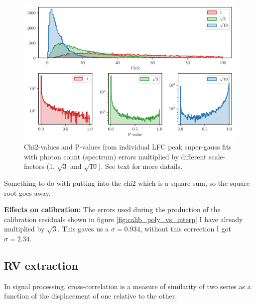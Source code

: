     \begin{figure}[ht]
        \centering
        \includegraphics[scale=0.80]{figures/calib_errors2.pdf}
        \caption{Chi2-values and P-values from individual LFC peak super-gauss fits with photon count (spectrum) errors multiplied by different scale-factors (1, $\sqrt{3}$ and $\sqrt{10}$). See text for more datails.}
        \label{fig:calib_errors}
    \end{figure}

     Something to do with putting into the chi2 which is a square sum, so the square-root goes away. 

    \bigbreak

    \noindent \textbf{Effects on calibration:} \newline
    The errors used during the production of the calibration residuals shown in figure \ref{fig:calib_poly_vs_interp} I have already multiplied by $\sqrt{3}$. This gaves us a $\sigma = 0.934$, without this correction I got $\sigma = 2.34$. 


\subsection{RV extraction}

    

    In signal processing, cross-correlation is a measure of similarity of two series as a function 
    of the displacement of one relative to the other.

